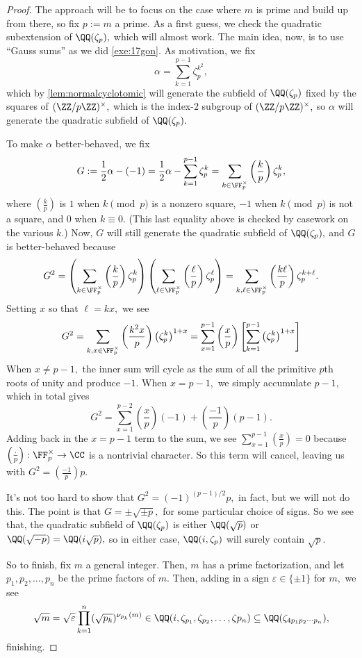 \begin{proof}
	The approach will be to focus on the case where $m$ is prime and build up from there, so fix $p:=m$ a prime. As a first guess, we check the quadratic subextension of $\QQ(\zeta_p),$ which will almost work. The main idea, now, is to use ``Gauss sums'' as we did \autoref{exe:17gon}. As motivation, we fix
	\[\alpha=\sum_{k=1}^{p-1}\zeta_p^{k^2},\]
	which by \autoref{lem:normalcyclotomic} will generate the subfield of $\QQ(\zeta_p)$ fixed by the squares of $(\ZZ/p\ZZ)^\times,$ which is the index-$2$ subgroup of $(\ZZ/p\ZZ)^\times,$ so $\alpha$ will generate the quadratic subfield of $\QQ(\zeta_p).$
	
	To make $\alpha$ better-behaved, we fix
	\[G:=\frac12\alpha-(-1)=\frac12\alpha-\sum_{k=1}^{p-1}\zeta_p^k=\sum_{k\in\FF_p^\times}\left(\frac kp\right)\zeta_p^k,\]
	where $\left(\frac kp\right)$ is $1$ when $k\pmod p$ is a nonzero square, $-1$ when $k\pmod p$ is not a square, and $0$ when $k\equiv0.$ (This last equality above is checked by casework on the various $k.$) Now, $G$ will still generate the quadratic subfield of $\QQ(\zeta_p),$ and $G$ is better-behaved because
	\[G^2=\left(\sum_{k\in\FF_p^\times}\left(\frac kp\right)\zeta_p^k\right)\left(\sum_{\ell\in\FF_p^\times}\left(\frac\ell p\right)\zeta_p^\ell\right)=\sum_{k,\ell\in\FF_p^\times}\left(\frac{k\ell}p\right)\zeta_p^{k+\ell}.\]
	Setting $x$ so that $\ell=kx,$ we see
	\[G^2=\sum_{k,x\in\FF_p^\times}\left(\frac{k^2x}p\right)\left(\zeta_p^k\right)^{1+x}=\sum_{x=1}^{p-1}\left(\frac xp\right)\left[\sum_{k=1}^{p-1}\left(\zeta_p^k\right)^{1+x}\right]\]
	When $x\ne p-1,$ the inner sum will cycle as the sum of all the primitive $p$th roots of unity and produce $-1.$ When $x=p-1,$ we simply accumulate $p-1,$ which in total gives
	\[G^2=\sum_{x=1}^{p-2}\left(\frac xp\right)(-1)+\left(\frac{-1}p\right)(p-1).\]
	Adding back in the $x=p-1$ term to the sum, we see $\sum_{x=1}^{p-1}\left(\frac xp\right)=0$ because $\left(\frac{\cdot}p\right):\FF_p^\times\to\CC$ is a nontrivial character. So this term will cancel, leaving us with $G^2=\left(\frac{-1}p\right)p.$

	It's not too hard to show that $G^2=(-1)^{(p-1)/2}p,$ in fact, but we will not do this. The point is that $G=\pm\sqrt{\pm p},$ for some particular choice of signs. So we see that, the quadratic subfield of $\QQ(\zeta_p)$ is either $\QQ(\sqrt p)$ or $\QQ(\sqrt{-p})=\QQ(i\sqrt p),$ so in either case, $\QQ(i,\zeta_p)$ will surely contain $\sqrt p.$

	So to finish, fix $m$ a general integer. Then, $m$ has a prime factorization, and let $p_1,p_2,\ldots,p_n$ be the prime factors of $m.$ Then, adding in a sign $\varepsilon\in\{\pm1\}$ for $m,$ we see
	\[\sqrt m=\sqrt\varepsilon\prod_{k=1}^n(\sqrt{p_k})^{\nu_{p_k}(m)}\in\QQ(i,\zeta_{p_1},\zeta_{p_2},\ldots,\zeta{p_n})\subseteq\QQ(\zeta_{4p_1p_2\cdots p_n}),\]
	finishing.
\end{proof}
